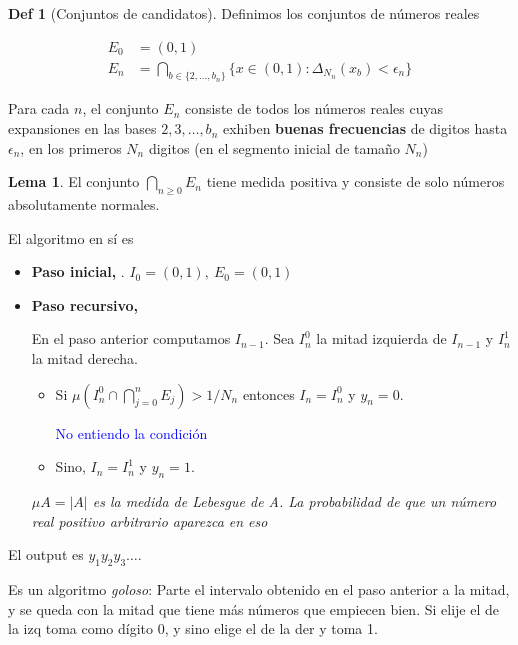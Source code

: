 \documentclass{report}
\theoremstyle{definition} %
\newtheorem*{lemma*}{Lema}
\newtheorem*{definition*}{Def}
\begin{document}
\begin{definition*}[Conjuntos de candidatos]
    Definimos los conjuntos de números reales

    \begin{align*}
        E_0 &= (0, 1) \\
        E_n &= \bigcap_{b \in \{ 2, \dots, b_n \} }
            \{ x \in (0, 1) : \Delta_{N_n} (x_b) < \epsilon_n \}
    \end{align*}

    Para cada $n$, el conjunto $E_n$ consiste de todos los números reales cuyas
    expansiones en las bases $2, 3, \dots, b_n$ exhiben \textbf{buenas
    frecuencias} de digitos hasta $\epsilon_n$, en los primeros $N_n$ digitos
    (en el segmento inicial de tamaño $N_n$)
\end{definition*}

\begin{lemma*}
    El conjunto $\bigcap_{n \geq 0} E_n$ tiene medida positiva y consiste de
    solo números absolutamente normales.
\end{lemma*}

El algoritmo en sí es

\begin{itemize}
    \item[] \textbf{Paso inicial,} . $I_0 = (0, 1),\ E_0 = (0, 1)$
    \item[] \textbf{Paso recursivo,} 
    
        En el paso anterior computamos $I_{n - 1}$. Sea $I_n^0$ la mitad
        izquierda de $I_{n - 1}$ y $I_n^1$ la mitad derecha.
        \begin{itemize}
            \item Si $\mu \left( I_n^0 \cap \bigcap_{j = 0}^{n} E_j \right) >
            1/N_n$ entonces $I_n = I_n^0$ y $y_n = 0$.

            \textcolor{blue}{No entiendo la condición}

            \item Sino, $I_n = I_n^1$ y $y_n = 1$.
        \end{itemize}
        \textit{$\mu A = |A|$ es la medida de Lebesgue de A. La probabilidad de que un número real positivo arbitrario aparezca en eso}
\end{itemize}

El output es $y_1y_2y_3\dots$.

Es un algoritmo \textit{goloso}: Parte el intervalo obtenido en el paso anterior
a la mitad, y se queda con la mitad que tiene más números que empiecen bien. Si
elije el de la izq toma como dígito 0, y sino elige el de la der y toma 1.
\end{document}
